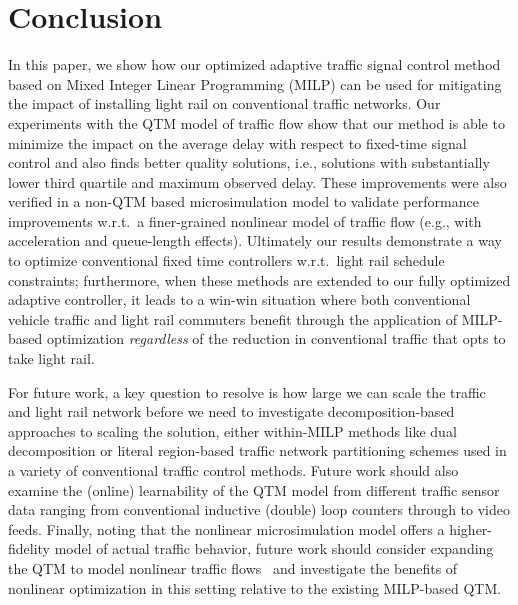 \section{Conclusion}

In this paper, we show how our optimized adaptive traffic signal
control method based on Mixed Integer Linear Programming (MILP) can be
used for mitigating the impact of installing light rail on
conventional traffic networks.  Our experiments with the QTM model of
traffic flow show that our method is able to minimize the impact on
the average delay with respect to fixed-time signal control and also
finds better quality solutions, i.e., solutions with substantially
lower third quartile and maximum observed delay.  These improvements
were also verified in a non-QTM based microsimulation model to
validate performance improvements w.r.t.\ a finer-grained nonlinear
model of traffic flow (e.g., with acceleration and queue-length
effects).
%
%
Ultimately our results demonstrate a way to optimize conventional
fixed time controllers w.r.t.\ light rail schedule constraints;
furthermore, when these methods are extended to our fully optimized
adaptive controller, it leads to a win-win situation where both
conventional vehicle traffic and light rail commuters benefit through
the application of MILP-based optimization \emph{regardless} of the
reduction in conventional traffic that opts to take light rail.

For future work, a key question to resolve is how large we can scale
the traffic and light rail network before we need to investigate
decomposition-based approaches to scaling the solution, either
within-MILP methods like dual decomposition or literal region-based
traffic network partitioning schemes used in a variety of conventional
traffic control methods.  Future
work should also examine the (online) learnability of the QTM model
from different traffic sensor data ranging from conventional inductive
(double) loop counters through to video feeds.  Finally, noting that
the nonlinear microsimulation model offers a higher-fidelity model of actual
traffic behavior, future work should consider expanding the QTM to
model nonlinear traffic
flows~\cite{lu2011discrete,muralidharan2009freeway,kim2002online,huang2011traffic}
and investigate the benefits of nonlinear optimization in this
setting relative to the existing MILP-based QTM.

